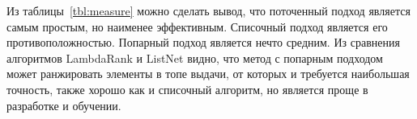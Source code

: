 Из таблицы~\ref{tbl:measure} можно сделать вывод, что поточенный подход является самым простым, но наименее эффективным. Списочный подход является его противоположностью. Попарный подход является нечто средним. Из сравнения алгоритмов LambdaRank и ListNet видно, что метод с попарным подходом может ранжировать элементы в топе выдачи, от которых и требуется наибольшая точность, также хорошо как и списочный алгоритм, но является проще в разработке и обучении.